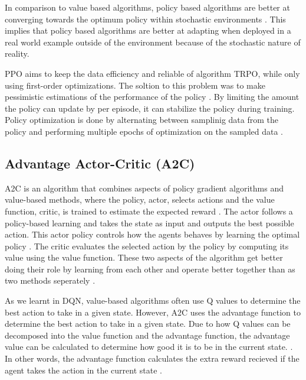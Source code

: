 In comparison to value based algorithms, policy based algorithms are better at converging towards the optimum policy within stochastic environments \cite{mnih2015human}. This implies that policy based algorithms are better at adapting when deployed in a real world example outside of the environment because of the stochastic nature of reality. 

PPO aims to keep the data efficiency and reliable of algorithm TRPO, while only using first-order optimizations. The soltion to this problem was to make pessimistic estimations of the performance of the policy \cite{schulman2017proximal}. By limiting the amount the policy can update by per episode, it can stabilize the policy during training. Policy optimization is done by alternating between samplinig data from the policy and performing multiple epochs of optimization on the sampled data \cite{schulman2017proximal}. 

\subsection{Advantage Actor-Critic (A2C)}

A2C is an algorithm that combines aspects of policy gradient algorithms and value-based methods, where the policy, actor, selects actions and the value function, critic, is trained to estimate the expected reward \cite{mnih2013playing}. The actor follows a policy-based learning and takes the state as input and outputs the best possible action. This actor policy controls how the agents behaves by learning the optimal policy \cite{SergiosKaragiannakos2018}. The critic evaluates the selected action by the policy by computing its value using the value function. These two aspects of the algorithm get better doing their role by learning from each other and operate better together than as two methods seperately \cite{SergiosKaragiannakos2018}. 

As we learnt in DQN, value-based algorithms often use Q values to determine the best action to take in a given state. However, A2C uses the advantage function to determine the best action to take in a given state. Due to how Q values can be decomposed into the value function and the advantage function, the advantage value can be calculated to determine how good it is to be in the current state. \cite{SergiosKaragiannakos2018}. In other words, the advantage function calculates the extra reward recieved if the agent takes the action in the current state \cite{ThomasSimonini2022A2C}.

